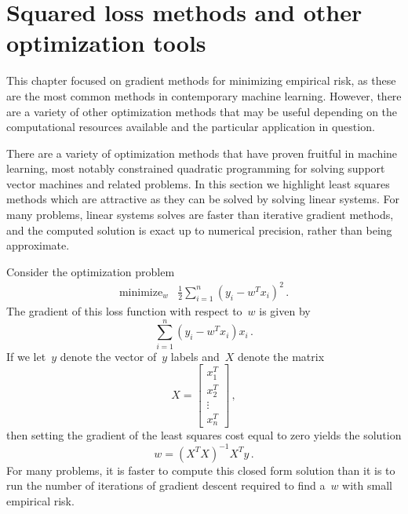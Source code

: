 \documentclass{tufte-book}
\begin{document}
\hypertarget{squared-loss-methods-and-other-optimization-tools}{%
\section{Squared loss methods and other optimization
tools}\label{squared-loss-methods-and-other-optimization-tools}}


This chapter focused on gradient methods for minimizing empirical risk,
as these are the most common methods in contemporary machine learning.
However, there are a variety of other optimization methods that may be
useful depending on the computational resources available and the
particular application in question.

There are a variety of optimization methods that have proven fruitful in
machine learning, most notably constrained quadratic programming for
solving support vector machines and related problems. In this section we
highlight least squares methods which are attractive as they can be
solved by solving linear systems. For many problems, linear systems
solves are faster than iterative gradient methods, and the computed
solution is exact up to numerical precision, rather than being
approximate.

Consider the optimization problem \[
\begin{array}{ll}
    \text{minimize}_w  & \tfrac{1}{2}\sum_{i=1}^n (y_i-w^T x_i)^2 \,.
    \end{array}
\] The gradient of this loss function with respect to~\(w\) is given by
\[
    \sum_{i=1}^n (y_i-w^T x_i)x_i \,.
\] If we let~\(y\) denote the vector of~\(y\) labels and~\(X\) denote
the matrix \[
    X = \begin{bmatrix} x_1^T\\ x_2^T \\ \vdots \\ x_n^T \end{bmatrix}\,,
\] then setting the gradient of the least squares cost equal to zero
yields the solution \[
    w = (X^T X)^{-1} X^T y\,.
\] For many problems, it is faster to compute this closed form solution
than it is to run the number of iterations of gradient descent required
to find a~\(w\) with small empirical risk.
\end{document}
